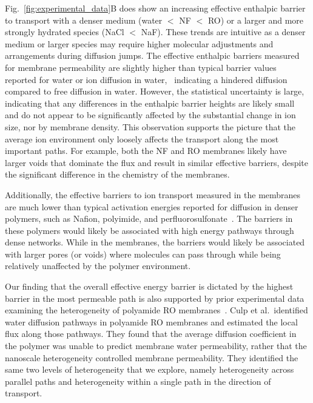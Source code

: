 \documentclass[12pt]{article}
\begin{document}
Fig.~\ref{fig:experimental_data}B does show an increasing effective enthalpic barrier to transport with a denser medium (water $<$ NF $<$ RO) or a larger and more strongly hydrated species (NaCl $<$ NaF). These trends are intuitive as a denser medium or larger species may require higher molecular adjustments and arrangements during diffusion jumps. The effective enthalpic barriers measured for membrane permeability are slightly higher than typical barrier values reported for water or ion diffusion in water,~\cite{wang_self-diffusion_1953,talekar_temperature_2009} indicating a hindered diffusion compared to free diffusion in water. However, the statistical uncertainty is large, indicating that any differences in the enthalpic barrier heights are likely small and do not appear to be significantly affected by the substantial change in ion size, nor by membrane density. This observation supports the picture that the average ion environment only loosely affects the transport along the most important paths. For example, both the NF and RO membranes likely have larger voids that dominate the flux and result in similar effective barriers, despite the significant difference in the chemistry of the membranes.

Additionally, the effective barriers to ion transport measured in the membranes are much lower than typical activation energies reported for diffusion in denser polymers, such as Nafion, polyimide, and perfluorosulfonate~\cite{das_metal_1994,yeager_ionic_1979,xue_diffusion_2017}. The barriers in these polymers would likely be associated with high energy pathways through dense networks. While in the membranes, the barriers would likely be associated with larger pores (or voids) where molecules can pass through while being relatively unaffected by the polymer environment. 

Our finding that the overall effective energy barrier is dictated by the highest barrier in the most permeable path is also supported by prior experimental data examining the heterogeneity of polyamide RO membranes~\cite{culp_nanoscale_2021}.  Culp et al.~identified water diffusion pathways in polyamide RO membranes and estimated the local flux along those pathways. They found that the average diffusion coefficient in the polymer was unable to predict membrane water permeability, rather that the nanoscale heterogeneity controlled membrane permeability. They identified the same two levels of heterogeneity that we explore, namely heterogeneity across parallel paths and heterogeneity within a single path in the direction of transport. 
\end{document}

